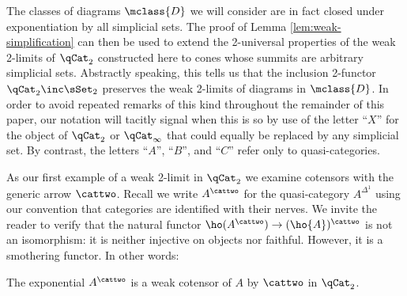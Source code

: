 \begin{obs}
The classes of diagrams $\mclass{D}$ we will consider are in fact closed under exponentiation by all simplicial sets. The proof of Lemma \ref{lem:weak-simplification} can then be used to extend the 2-universal properties of the weak 2-limits of $\qCat_2$ constructed here to cones whose summits are arbitrary simplicial sets.  Abstractly speaking, this tells us that the inclusion 2-functor $\qCat_2\inc\sSet_2$ preserves the weak 2-limits of diagrams in $\mclass{D}$. 
In order to avoid repeated remarks of this kind throughout the remainder of this paper, our notation will tacitly signal when this is so by use of the letter ``$X$'' for the object of $\qCat_2$ or $\qCat_\infty$ that could equally be replaced by any simplicial set. By contrast, the letters ``$A$'', ``$B$'', and ``$C$'' refer only to quasi-categories.
\end{obs}

As our first example of a weak 2-limit in $\qCat_2$ we examine cotensors with the generic arrow $\cattwo$. 
Recall we write $A^\cattwo$ for the quasi-category $A^{\Delta^1}$ using our convention that categories are identified with their nerves. We invite the reader to verify that the natural functor $\ho(A^\cattwo) \to (\ho{A})^\cattwo$ is not an isomorphism: it is neither injective on objects nor faithful. However, it is a smothering functor. In other words:

\begin{prop}\label{prop:weak-cotensors} 
The exponential $A^\cattwo$ is a weak cotensor of $A$ by $\cattwo$ in 
$\qCat_2$.
\end{prop}

